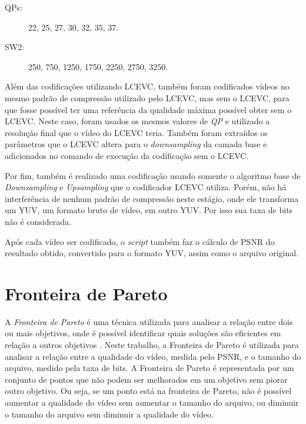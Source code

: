 \begin{description}
\item[QPs:] 22, 25, 27, 30, 32, 35, 37.
\item[SW2:] 250, 750, 1250, 1750, 2250, 2750, 3250.
\end{description}

Além das codificações utilizando \acrshort{LCEVC}, também foram codificados vídeos no mesmo
padrão de compressão utilizado pelo \acrshort{LCEVC}, mas sem o \acrshort{LCEVC}, para que fosse possível 
ter uma referência da qualidade máxima possível obter sem o \acrshort{LCEVC}. Neste caso, foram usados
os mesmos valores de \textit{QP} e utilizado a resolução final que o vídeo do \acrshort{LCEVC} teria.
Também foram extraídos os parâmetros que o LCEVC altera para o \textit{downsampling} da camada
base e adicionados no comando de execução da codificação sem o \acrshort{LCEVC}.
 
Por fim, também é realizado uma codificação usando somente o algoritmo base de \textit{Downsampling}
e \textit{Upsampling} que o codificador \acrshort{LCEVC} utiliza. Porém, não há interferência de nenhum padrão
de compressão neste estágio, onde ele transforma um YUV, um formato bruto de vídeo, em outro YUV. Por isso
sua taxa de bits não é considerada.

Após cada vídeo ser codificado, o \textit{script} também faz o cálculo de \acrfull{PSNR} do resultado obtido,
convertido para o formato YUV, assim como o arquivo original.

\section{Fronteira de Pareto}

A \textit{Fronteira de Pareto} é uma técnica utilizada para analisar a relação entre dois ou mais
objetivos, onde é possível identificar quais soluções são eficientes em relação a
outros objetivos \cite{pareto_definition}. Neste trabalho, a Fronteira de Pareto é utilizada para analisar a relação
entre a qualidade do vídeo, medida pelo \acrshort{PSNR}, e o tamanho do arquivo, medido pela taxa de bits.
A Fronteira de Pareto é representada por um conjunto de pontos que não podem ser melhorados em um
objetivo sem piorar outro objetivo. Ou seja, se um ponto está na fronteira de Pareto, não é possível
aumentar a qualidade do vídeo sem aumentar o tamanho do arquivo, ou diminuir o tamanho do arquivo sem
diminuir a qualidade do vídeo.

